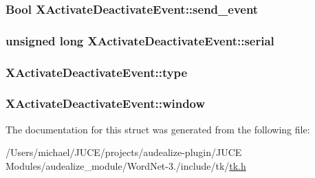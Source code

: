 \subsubsection[{\texorpdfstring{send\+\_\+event}{send_event}}]{\setlength{\rightskip}{0pt plus 5cm}Bool X\+Activate\+Deactivate\+Event\+::send\+\_\+event}\hypertarget{struct_x_activate_deactivate_event_ada925833926718350b0bce03d8ed8818}{}\label{struct_x_activate_deactivate_event_ada925833926718350b0bce03d8ed8818}
\subsubsection[{\texorpdfstring{serial}{serial}}]{\setlength{\rightskip}{0pt plus 5cm}unsigned long X\+Activate\+Deactivate\+Event\+::serial}\hypertarget{struct_x_activate_deactivate_event_a251bc209858b9c3128d9e5033c581694}{}\label{struct_x_activate_deactivate_event_a251bc209858b9c3128d9e5033c581694}
\subsubsection[{\texorpdfstring{type}{type}}]{ X\+Activate\+Deactivate\+Event\+::type}\hypertarget{struct_x_activate_deactivate_event_ac4a5d2abebf391042e9a18d1ca3887b3}{}\label{struct_x_activate_deactivate_event_ac4a5d2abebf391042e9a18d1ca3887b3}
\subsubsection[{\texorpdfstring{window}{window}}]{ X\+Activate\+Deactivate\+Event\+::window}\hypertarget{struct_x_activate_deactivate_event_a72d16f7aff7621a6ae2512773e8dd8b0}{}\label{struct_x_activate_deactivate_event_a72d16f7aff7621a6ae2512773e8dd8b0}


The documentation for this struct was generated from the following file\+:\begin{DoxyCompactItemize}
\item 
/\+Users/michael/\+J\+U\+C\+E/projects/audealize-\/plugin/\+J\+U\+C\+E Modules/audealize\+\_\+module/\+Word\+Net-\/3./include/tk/\hyperlink{tk_8h}{tk.\+h}\end{DoxyCompactItemize}
